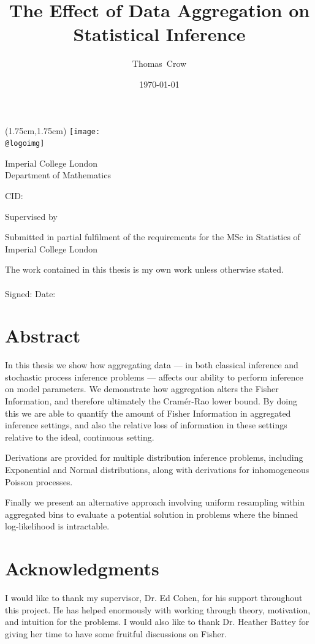 \documentclass[11pt,a4,twosided,singlespacing,titlepagenumber=on,numbers=endperiod]{scrreprt}
\title{The Effect of Data Aggregation on Statistical Inference}
\author{Thomas~Crow}
\date{\today}
\makeatletter
\numberwithin{equation}{chapter} %
\theoremstyle{remark}
\renewcommand{\titlefont}{\normalcolor \normalfont \bfseries \Huge}
\renewcommand{\maketitle}{
\begin{titlepage}
\ifdefined\@logoimg
\begin{textblock*}{8cm}(1.75cm,1.75cm)
\texttt{[image: \\@logoimg]}
\end{textblock*}
\vspace*{1cm}
\else
\fi
\begin{center}
\vspace*{\stretch{0.1}}
Imperial College London\\
Department of Mathematics\par
\vspace*{\stretch{1}} %
{\titlefont \@title\par} %
\vspace*{\stretch{2}}
{\Large \@author \par}
\vspace*{1em}
{\large CID: \@CID \par}
\vspace*{\stretch{0.5}}
{\large Supervised by \@supervisor \par}
\vspace*{\stretch{3}}
{\Large \@date \par}
\vspace*{\stretch{1}}
{\large Submitted in partial fulfilment of the requirements for the
MSc in Statistics of Imperial College London}
\vspace*{\stretch{0.1}}
\end{center}%
\end{titlepage}%
}
\newcommand*{\declaration}{%
\vspace*{0.3\textheight}
The work contained in this thesis is my own work unless
otherwise stated.\\
\vspace*{0.1\textheight}\\
\hspace*{0.25\textwidth}Signed: \hspace{0.25\textwidth} Date:
\clearpage}
\renewenvironment{abstract}%
{\chapter*{Abstract}\thispagestyle{plain}}%
{\clearpage}
\makeatother
\begin{document}
\maketitle %

\declaration %

\begin{abstract}
In this thesis we show how aggregating data --- in both classical inference and stochastic process inference problems --- affects our ability to perform inference on model parameters. We demonstrate how aggregation alters the Fisher Information, and therefore ultimately the Cram\'er-Rao lower bound. By doing this we are able to quantify the amount of Fisher Information in aggregated inference settings, and also the relative loss of information in these settings relative to the ideal, continuous setting.

Derivations are provided for multiple distribution inference problems, including Exponential and Normal distributions, along with derivations for inhomogeneous Poisson processes.

Finally we present an alternative approach involving uniform resampling within aggregated bins to evaluate a potential solution in problems where the binned log-likelihood is intractable.

\end{abstract}


\newpage
\chapter*{Acknowledgments}
I would like to thank my supervisor, Dr. Ed Cohen, for his support throughout this project. He has helped enormously with working through theory, motivation, and intuition for the problems. I would also like to thank Dr. Heather Battey for giving her time to have some fruitful discussions on Fisher.
\newpage

\renewcommand{\contentsname}{Table of Contents}
\tableofcontents
\newpage



\end{document}
